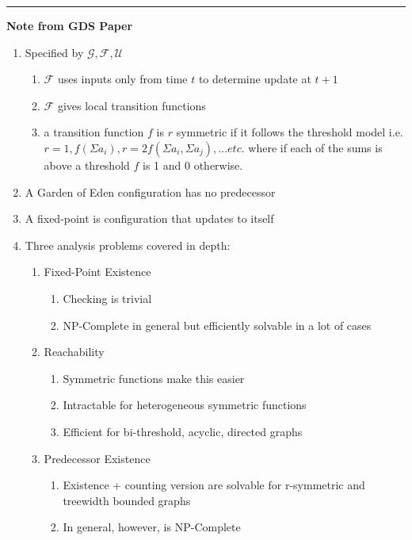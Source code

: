 \documentclass[11pt]{article}
\begin{document}
\smallskip
\noindent
\rule{\textwidth}{0.01in}
\textbf{Note from GDS Paper}
\begin{enumerate}
    \item Specified by $\mathcal{G, F, U}$
    \begin{enumerate}
        \item $\mathcal{F}$ uses inputs only from time $t$ to determine update at $t+1$
        \item $\mathcal{F}$ gives local transition functions
        \item a transition function $f$ is $r$ symmetric if it follows the threshold model i.e. $r=1,f(\Sigma a_{i}), r=2 f(\Sigma a_{i}, \Sigma a_{j}), ... etc.$ where if each of the sums is above a threshold $f$ is 1 and 0 otherwise.
    \end{enumerate}
    \item A Garden of Eden configuration has no predecessor
    \item A fixed-point is configuration that updates to itself
    
    \item Three analysis problems covered in depth:
    \begin{enumerate}
        \item Fixed-Point Existence
        \begin{enumerate}
            \item Checking is trivial
            \item NP-Complete in general but efficiently solvable in a lot of cases
        \end{enumerate}
        \item Reachability
        \begin{enumerate}
            \item Symmetric functions make this easier
            \item Intractable for heterogeneous symmetric functions
            \item Efficient for bi-threshold, acyclic, directed graphs
        \end{enumerate}
        \item Predecessor Existence
        \begin{enumerate}
            \item Existence + counting version are solvable for r-symmetric and treewidth bounded graphs
            \item In general, however, is NP-Complete
        \end{enumerate}
    \end{enumerate}
\end{enumerate}
\end{document}

